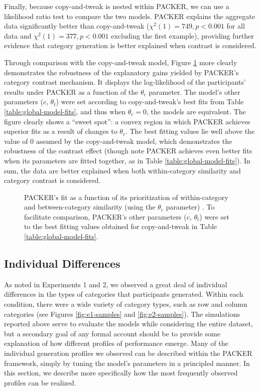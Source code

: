 \documentclass[12pt]{article}
\newcommand\inputpgf[2]{{
\let\pgfimageWithoutPath\pgfimage
\renewcommand{\pgfimage}[2][]{\pgfimageWithoutPath[##1]{#1/##2}}

}}
\begin{document}
\begin{flushleft}
Finally, because copy-and-tweak is nested within PACKER, we can use a likelihood
ratio test to compare the two models. PACKER explains the aggregate data
significantly better than copy-and-tweak ($\chi^2(1) = 749, p < 0.001$ for all
data and $\chi^2(1) = 377, p < 0.001$ excluding the first example), providing
further evidence that category generation is better explained when contrast is
considered.

Through comparison with the copy-and-tweak model, Figure
\ref{fig:packer-loglike} more clearly demonstrates the robustness of the
explanatory gains yielded by PACKER's category contrast mechanism. It displays
the log-likelihood of the participants' results under PACKER as a function of
the $\theta_c$ parameter. The model's other parameters ($c$,
$\theta_t$) were set according to copy-and-tweak's best fits from Table
\ref{table:global-model-fits}, and thus when $\theta_c=0$, the models are
equivalent. The figure clearly shows a ``sweet spot'': a convex region in which
PACKER achieves superior fits as a result of changes to $\theta_c$. The
best fitting values lie well above the value of 0 assumed by the copy-and-tweak
model, which demonstrates the robustness of the contrast effect (though note
PACKER achieves even better fits when its parameters are fitted together, as in
Table \ref{table:global-model-fits}). In sum, the data are better explained when
both within-category similarity and category contrast is considered.

\begin{figure}
    \begin{center} \inputpgf{figs/}{packer-loglike.pgf}
      \caption{PACKER's fit as a function of its prioritization of
        within-category and between-category similarity (using the
        $\theta_c$ parameter) . To facilitate comparison, PACKER's other
        parameters ($c$, $\theta_t$) were set to the best fitting values
        obtained for copy-and-tweak in Table \ref{table:global-model-fits}. }
    \label{fig:packer-loglike}
    \end{center}
\end{figure}


\subsection{Individual Differences}
\label{section:individual-diffs}

As noted in Experiments 1 and 2, we observed a great deal of individual
differences in the types of categories that participants generated. Within each
condition, there were a wide variety of category types, such as row and column
categories (see Figures \ref{fig:e1-samples} and \ref{fig:e2-samples}). The
simulations reported above serve to evaluate the models while considering the
entire dataset, but a secondary goal of any formal account should be to provide
some explanation of how different profiles of performance emerge. Many of the
individual generation profiles we observed can be described within the PACKER
framework, simply by tuning the model's parameters in a principled manner. In
this section, we describe more specifically how the most frequently observed
profiles can be realized.


\end{flushleft}
\end{document}

